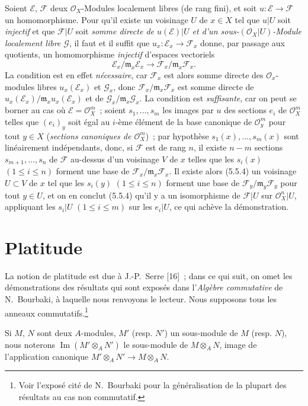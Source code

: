 \begin{env}[5.5.5]
\label{0.5.5.5-fr}
Soient $\mathcal{E}$, $\mathcal{F}$ deux $\mathcal{O}_X$-Modules localement
libres (de rang fini), et soit $u:\mathcal{E}\to\mathcal{F}$ un
homomorphisme. Pour qu'il existe un voisinage $U$ de $x\in X$ tel que $u|U$
soit \emph{injectif} et que $\mathcal{F}|U$ soit \emph{somme directe de
$u(\mathcal{E})|U$ et d'un sous-$(\mathcal{O}_X|U)$-Module localement libre
$\mathcal{G}$}, il faut et il suffit que
$u_x:\mathcal{E}_x\to\mathcal{F}_x$ donne, par passage aux quotients, un
homomorphisme \emph{injectif} d'espaces vectoriels
\[
  \mathcal{E}_x/\mathfrak{m}_x\mathcal{E}_x
  \longrightarrow
  \mathcal{F}_x/\mathfrak{m}_x\mathcal{F}_x.
\]
La condition est en effet \emph{nécessaire}, car $\mathcal{F}_x$ est alors
somme directe des $\mathcal{O}_x$-modules libres $u_x(\mathcal{E}_x)$ et
$\mathcal{G}_x$, donc $\mathcal{F}_x/\mathfrak{m}_x\mathcal{F}_x$ est somme
directe de
$u_x(\mathcal{E}_x)/\mathfrak{m}_x u_x(\mathcal{E}_x)$ et de
$\mathcal{G}_x/\mathfrak{m}_x\mathcal{G}_x$. La condition est
\emph{suffisante}, car on peut se borner au cas où
$\mathcal{E}=\mathcal{O}_X^m$~; soient $s_1,\ldots,s_m$ les images par $u$ des
sections $e_i$ de $\mathcal{O}_X^m$ telles que $(e_i)_y$ soit égal au $i$-ème
élément de la base canonique de $\mathcal{O}_y^m$ pour tout $y\in X$
(\emph{sections canoniques de $\mathcal{O}_X^m$})~; par hypothèse
$s_1(x),\ldots,s_m(x)$ sont linéairement indépendants, donc, si $\mathcal{F}$
est de rang $n$, il existe $n-m$ sections $s_{m+1},\ldots,s_n$ de
$\mathcal{F}$ au-dessus d'un voisinage $V$ de $x$ telles que les $s_i(x)$
$(1\leq i\leq n)$ forment une base de
$\mathcal{F}_x/\mathfrak{m}_x\mathcal{F}_x$. Il existe alors (5.5.4) un
voisinage $U\subset V$ de $x$ tel que les $s_i(y)$ $(1\leq i\leq n)$ forment
une base de $\mathcal{F}_y/\mathfrak{m}_y\mathcal{F}_y$ pour tout $y\in U$,
et on en conclut (5.5.4) qu'il y a un isomorphisme de $\mathcal{F}|U$ sur
$\mathcal{O}_X^n|U$, appliquant les $s_i|U$ $(1\leq i\leq m)$ sur les
$e_i|U$, ce qui achève la démonstration.
\end{env}

\section{Platitude}
\label{section:0.6-fr}

\begin{env}[6.0]
\label{0.6.0.0-fr}
La notion de platitude est due à J.-P.~Serre [16]~; dans ce qui suit, on omet
les démonstrations des résultats qui sont exposés dans l'\emph{Algèbre
commutative} de N.~Bourbaki, à laquelle nous renvoyons le lecteur. Nous
supposons tous les anneaux commutatifs.\footnote{Voir l'exposé cité de
N.~Bourbaki pour la généralisation de la plupart des résultats au cas non
commutatif.}


Si $M$, $N$ sont deux $A$-modules, $M'$ (resp. $N'$) un sous-module de $M$
(resp. $N$), nous noterons $\operatorname{Im}(M'\otimes_A N')$ le sous-module
de $M\otimes_A N$, image de l'application canonique
$M'\otimes_A N'\to M\otimes_A N$.
\end{env}

